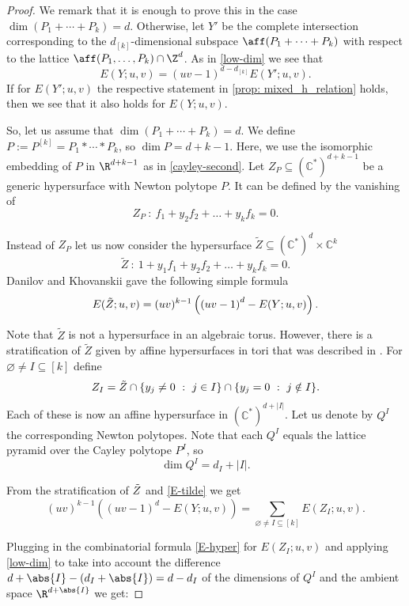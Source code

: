 \documentclass[reqno, 11pt, a4paper, oneside]{amsart}
\begin{document}
\begin{proof}

We remark that it is enough to prove this in the case $\dim(P_1 + \cdots + P_k)=d$. Otherwise, let $Y'$ be the complete intersection corresponding to the $d_{[k]}$-dimensional subspace $\aff(P_1 + \cdots + P_k)$ with respect to the lattice $\aff(P_1, \ldots, P_k) \cap \Z^d$. As in \eqref{low-dim} we see that 
\[E(Y;u,v)=(uv-1)^{d-d_{[k]}} E(Y';u,v).\]
If for $E(Y';u,v)$ the respective statement in \cref{prop: mixed_h_relation} holds, then we see that it also holds for $E(Y;u,v)$.

So, let us assume that $\dim(P_1 + \cdots + P_k)=d$. We define $P := P^{[k]} = P_1 * \cdots * P_k$, so $\dim P = d+k-1$. Here, we use the isomorphic embedding of $P$ in $\R^{d+k-1}$ as in \eqref{cayley-second}. Let $Z_P \subseteq (\mathbb{C}^*)^{d+k-1}$ be a generic hypersurface with Newton polytope $P$. It can be defined  by the vanishing of 
\[ Z_P ~:~ f_1 + y_2 f_2 + \ldots + y_{k} f_{k} =0.  \] 

Instead of $Z_P$ let us now consider the hypersurface  $\tilde{Z} \subseteq (\mathbb{C}^*)^{d} \times \mathbb{C}^k$
\[ \tilde{Z} ~:~ 1+ y_1 f_1 + y_2 f_2 + \ldots + y_{k} f_{k} =0. \] 
Danilov and Khovanskii \cite[Section 6]{danilov_newton_1987} gave the following simple formula 
 \begin{equation}
     E(\Tilde{Z}; u,v) = (u v)^{k-1} \left( \left( uv -1 \right)^{d} - E (Y; u,v) \right). \label{E-tilde}
     \end{equation}

Note  that $\tilde{Z}$  is not a hypersurface in an algebraic torus. However, there is a stratification of $\tilde{Z}$ given by affine hypersurfaces in tori that was described in \cite{di_rocco_discrete_2016}. For $\varnothing \not= I \subseteq [k]$ define 
\[ {Z}_I = \Tilde{Z} \cap \{ y_j \neq 0 ~ :~ j \in I\} \cap \{ y_j =0 ~: ~j \notin I \}. \] 
Each of these is now an affine hypersurface in $(\mathbb{C}^*)^{d+|I|}$. Let us denote by $Q^I$ the corresponding Newton polytopes. Note that each $Q^I$ equals the lattice pyramid over the Cayley polytope $P^I$, so \[ \dim Q^I = d_I+|I|. \] 

From the stratification of $\Tilde{Z}$ and \eqref{E-tilde} we get
\[ (u v)^{k-1} \left( \left( u v -1 \right)^{d} - E(Y; u,v) \right) = \sum_{\varnothing\not= I \subseteq [k]} E({Z}_I ; u,v).   \] 

Plugging in the combinatorial formula \eqref{E-hyper} for $E({Z}_I ; u,v)$ and applying \eqref{low-dim} to take into account the difference $d+\abs{I}-(d_I+\abs{I})=d-d_I$ of the dimensions of $Q^I$ and the ambient space $\R^{d+\abs{I}}$ we get:


\end{proof}
\end{document}
